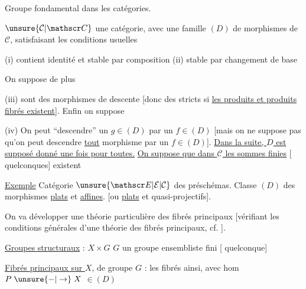 Groupe fondamental dans les catégories.

$\unsure{\mathcal C|\mathscr C}$ une catégorie, avec une famille $(D)$ de morphismes
de $\mathcal C$, satisfaisant les conditions usuelles

(i) contient identité et stable par composition (ii) stable par
changement de base

On suppose de plus

(iii)   sont des morphismes de descente [donc des
 stricts  si  \uline{les produits et produits}
\uline{fibrés existent}]. Enfin on suppose

\margin{On peut \unsure{axer|varier|aussi} la situation, en introduisant de plus \deleted{\unsure{la}} une classe de morphismes $D'$ [\deleted{de} morphismes pouvant être \unsure{``localement''} \unsure{fibrés}.}

(iv) On peut ``descendre'' un $g\in(D)$ par un $f\in(D)$
[mais on ne suppose pas qu'on peut descendre
\uline{tout} morphisme par un $f\in(D)$]. \uline{Dans la
suite, $D$ est supposé donné une fois pour toutes.}
\uline{On suppose que dans $\mathcal C$ les sommes finies} [ quelconques] existent\unsure{]|.}


\uline{Exemple} Catégorie  $\unsure{\mathscr E|\mathcal E|\mathcal C}$ des préschémas. 
Classe $(D)$ des morphismes \uline{plats} et \uline{affines}.
[ou \uline{plats} et quasi-projectifs].

On va développer une théorie particulière des
fibrés principaux [vérifiant les conditions générales
d'une théorie des fibrés principaux, cf. \unsure{---}].

\uline{Groupes structuraux} : $X\times G$ $G$ un groupe ensembliste
fini [ quelconque]

\uline{Fibrés principaux  sur $X$}, de groupe $G$ : les
fibrés \uline{} ainsi, avec hom $P\mathrel{\unsure{-|\to}}X$ $\in(D)$
